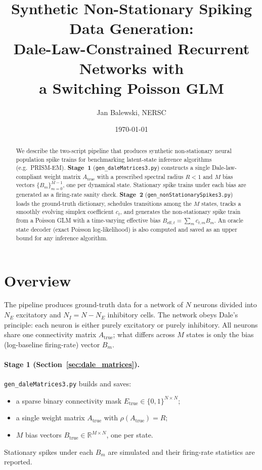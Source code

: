 \documentclass[11pt]{article}
\title{Synthetic Non-Stationary Spiking Data Generation:\\
Dale-Law-Constrained Recurrent Networks with\\
a Switching Poisson GLM}
\author{Jan Balewski, NERSC}
\date{\today}
\begin{document}
\maketitle

\begin{abstract}
We describe the two-script pipeline that produces synthetic non-stationary
neural population spike trains for benchmarking latent-state inference
algorithms (e.g.\ PRISM-EM).
\textbf{Stage~1} (\texttt{gen\_daleMatrices3.py}) constructs a single
Dale-law-compliant weight matrix $A_{\text{true}}$ with a prescribed
spectral radius $R<1$ and $M$ bias vectors $\{B_m\}_{m=0}^{M-1}$,
one per dynamical state.
Stationary spike trains under each bias are generated as a
firing-rate sanity check.
\textbf{Stage~2} (\texttt{gen\_nonStationarySpikes3.py}) loads the
ground-truth dictionary, schedules transitions among the $M$ states,
tracks a smoothly evolving simplex coefficient $c_t$, and generates
the non-stationary spike train from a Poisson GLM with a
time-varying effective bias $B_{\mathrm{eff},t} = \sum_m c_{t,m} B_m$.
An oracle state decoder (exact Poisson log-likelihood) is also
computed and saved as an upper bound for any inference algorithm.
\end{abstract}

\tableofcontents
\newpage

\section{Overview}
\label{sec:overview}

The pipeline produces ground-truth data for a network of $N$ neurons
divided into $N_E$ excitatory and $N_I = N - N_E$ inhibitory cells.
The network obeys Dale's principle: each neuron is either purely
excitatory or purely inhibitory.
All neurons share one connectivity matrix $A_{\text{true}}$; what
differs across $M$ states is only the bias (log-baseline firing-rate)
vector $B_m$.

\paragraph{Stage 1 (Section~\ref{sec:dale_matrices}).}
\texttt{gen\_daleMatrices3.py} builds and saves:
\begin{itemize}
  \item a sparse binary connectivity mask $E_{\text{true}} \in
        \{0,1\}^{N \times N}$;
  \item a single weight matrix $A_{\text{true}}$ with
        $\rho(A_{\text{true}}) = R$;
  \item $M$ bias vectors $B_{\text{true}} \in \mathbb{R}^{M \times N}$,
        one per state.
\end{itemize}
Stationary spikes under each $B_m$ are simulated and their
firing-rate statistics are reported.
\end{document}
